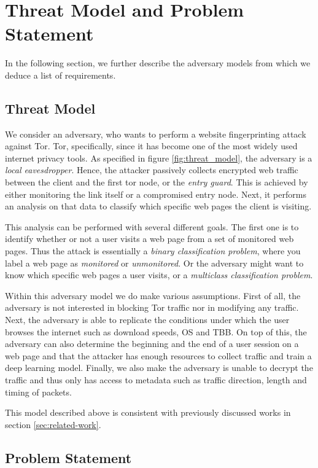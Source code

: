 \section{Threat Model and Problem Statement}

In the following section, we further describe the adversary models from which we deduce a list of requirements.

\subsection{Threat Model}

We consider an adversary, who wants to perform a website fingerprinting attack against Tor.
Tor, specifically, since it has become one of the most widely used internet privacy tools.
As specified in figure \ref{fig:threat_model}, the adversary is a \textit{local eavesdropper}.
Hence, the attacker passively collects encrypted web traffic between the client and the first tor node, or the \textit{entry guard}.
This is achieved by either monitoring the link itself or a compromised entry node.
Next, it performs an analysis on that data to classify which specific web pages the client is visiting.

This analysis can be performed with several different goals.
The first one is to identify whether or not a user visits a web page from a set of monitored web pages.
Thus the attack is essentially a \textit{binary classification problem}, where you label a web page as \textit{monitored} or \textit{unmonitored}.
Or the adversary might want to know which specific web pages a user visits, or a \textit{multiclass classification problem}.

Within this adversary model we do make various assumptions.
First of all, the adversary is not interested in blocking Tor traffic nor in modifying any traffic.
Next, the adversary is able to replicate the conditions under which the user browses the internet such as download speeds, OS and TBB.
On top of this, the adversary can also determine the beginning and the end of a user session on a web page and that the attacker has enough resources to collect traffic and train a deep learning model.
Finally, we also make the adversary is unable to decrypt the traffic and thus only has access to metadata such as traffic direction, length and timing of packets.

This model described above is consistent with previously discussed works in section \ref{sec:related-work}.

\subsection{Problem Statement}

